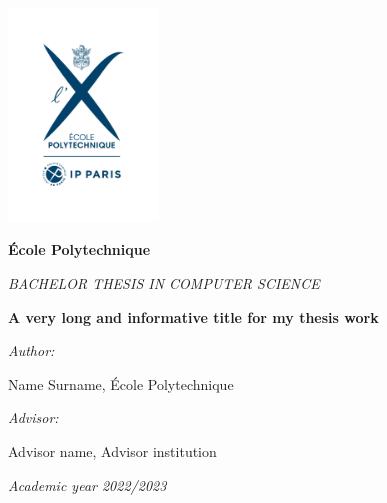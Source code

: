 \documentclass[oneside, a4paper, onecolumn, 10pt]{article}
\newcommand{\thesistitle}[0]{A very long and informative title for my thesis work}
\newcommand{\authorname}[0]{Name Surname}
\newcommand{\supervisor}[0]{Advisor name}
\newcommand{\supervisorinstitution}[0]{Advisor institution}
\begin{document}
\clearpage




\hspace{0pt}
\vfill

\begin{center}

\includegraphics[width=0.3\textwidth]{logo-EP-vertical}

\vspace*{2em}
%
{\large
\textbf{\'Ecole Polytechnique}

\vspace*{1em}
\textit{BACHELOR THESIS IN COMPUTER SCIENCE}


\vspace*{3em}
{\Huge \textbf{\thesistitle}}
\vspace*{3em}



\textit{Author:}

\vspace*{1em}
\authorname{}, \'Ecole Polytechnique

\vspace*{2em}
%
{\textit{Advisor:}}

\vspace*{1em}
\supervisor{}, \supervisorinstitution{}
}

\vspace*{2em}
\textit{Academic year 2022/2023}

\end{center}
\end{document}
